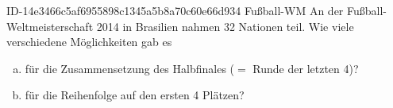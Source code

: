 \begin{exercise}
      {ID-14e3466c5af6955898c1345a5b8a70c60e66d934}
      {Fußball-WM}
  \ifproblem\problem
    An der Fußball-Weltmeisterschaft 2014 in Brasilien nahmen 32 Nationen
    teil. Wie viele verschiedene Möglichkeiten gab es
    \begin{enumerate}[a)]
      \item für die Zusammensetzung des Halbfinales ($=$ Runde der letzten 4)?
      \item für die Reihenfolge auf den ersten 4 Plätzen?
    \end{enumerate}
  \fi
\end{exercise}
